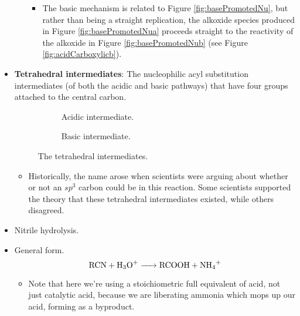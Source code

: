 \documentclass[../notes.tex]{subfiles}
\begin{document}
\begin{itemize}
\begin{itemize}
\begin{itemize}
            \item The basic mechanism is related to Figure \ref{fig:basePromotedNu}, but rather than being a straight replication, the alkoxide species produced in Figure \ref{fig:basePromotedNua} proceeds straight to the reactivity of the alkoxide in Figure \ref{fig:basePromotedNub} (see Figure \ref{fig:acidCarboxylicb}).
        \end{itemize}
    \end{itemize}
    \item \textbf{Tetrahedral intermediates}: The nucleophilic acyl substitution intermediates (of both the acidic and basic pathways) that have four groups attached to the central carbon.
    \begin{figure}[h!]
        \centering
        \footnotesize
        \begin{subfigure}[b]{0.3\linewidth}
            \centering
            \caption{Acidic intermediate.}
            \label{fig:tetrahedralIntermediatesa}
        \end{subfigure}
        \begin{subfigure}[b]{0.3\linewidth}
            \centering
            \caption{Basic intermediate.}
            \label{fig:tetrahedralIntermediatesb}
        \end{subfigure}
        \caption{The tetrahedral intermediates.}
        \label{fig:tetrahedralIntermediates}
    \end{figure}
    \begin{itemize}
        \item Historically, the name arose when scientists were arguing about whether or not an $sp^3$ carbon could be in this reaction. Some scientists supported the theory that these tetrahedral intermediates existed, while others disagreed.
    \end{itemize}
    \item Nitrile hydrolysis.
    \item General form.
    \begin{equation*}
        \ce{RCN + H3O+ -> RCOOH + NH4+}
    \end{equation*}
    \begin{itemize}
        \item Note that here we're using a stoichiometric full equivalent of acid, not just catalytic acid, because we are liberating ammonia which mops up our acid, forming  as a byproduct.

\end{itemize}
\end{itemize}
\end{document}
